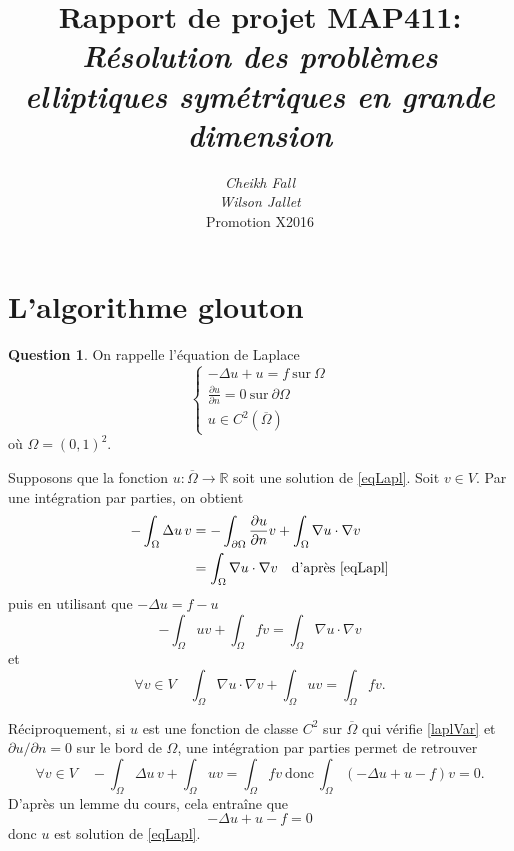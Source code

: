 \documentclass[11pt]{article}
\title{
	\textbf{Rapport de projet MAP411}:\\
	\textit{Résolution des problèmes elliptiques symétriques en grande dimension}}
\author{
	\textit{Cheikh Fall}\\
	\textit{Wilson Jallet}\\
Promotion X2016}
\newcommand{\RR}{\mathbb{R}}
\theoremstyle{definition}
\newtheorem{ques}{Question}
\begin{document}
\maketitle

\section{L'algorithme glouton}

\setlength{\parindent}{1cm}
\setlength{\parskip}{3mm}

\begin{ques}
On rappelle l'équation de Laplace
\begin{equation}\label{eqLapl}
\left\{
\begin{array}{l}
-\Delta u + u = f\ \text{sur}\ \Omega \\
\frac{\partial u}{\partial n} = 0\ \text{sur}\ \partial\Omega \\
u \in C^2(\overline{\Omega})
\end{array}
\right.
\end{equation}
où $\Omega = (0,1)^2$.

Supposons que la fonction $u:\overline\Omega\longrightarrow\RR$ soit une solution de \eqref{eqLapl}. Soit $v\in V$. Par une intégration par parties, on obtient
\begin{align*}
-\int_\Omega \Delta u\, v &= -\int_{\partial\Omega} \frac{\partial u}{\partial n}v + \int_\Omega \nabla u\cdot \nabla v \\
&= \int_\Omega \nabla u\cdot \nabla v \quad \text{d'après \eqref{eqLapl}}
\end{align*}
puis en utilisant que $-\Delta u = f-u$
\[
	-\int_\Omega uv + \int_\Omega fv = \int_\Omega \nabla u\cdot \nabla v
\]
et
\begin{equation}\label{laplVar}
\forall v\in V\quad
\int_\Omega \nabla u\cdot \nabla v + \int_\Omega uv = \int_\Omega fv.
\end{equation}


Réciproquement, si $u$ est une fonction de classe $C^2$ sur $\overline\Omega$ qui vérifie \eqref{laplVar} et $\partial u/\partial n = 0$ sur le bord de $\Omega$, une intégration par parties permet de retrouver 
\[
\forall v\in V\quad  -\int_\Omega \Delta u\, v + \int_\Omega uv = \int_\Omega fv \ \text{donc}\
\int_\Omega (-\Delta u + u -f)v = 0.
\]
D'après un lemme du cours, cela entraîne que\[ -\Delta u+ u -f = 0  \]
donc $u$ est solution de \eqref{eqLapl}.

\end{ques}
\end{document}
